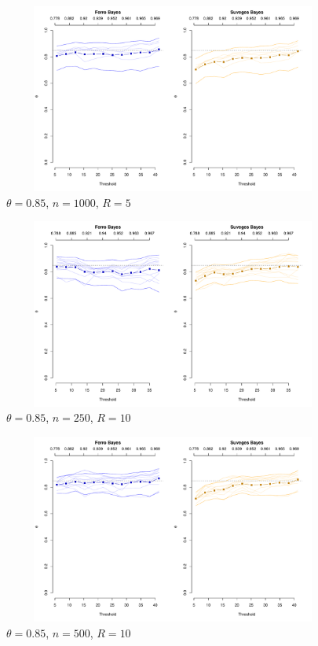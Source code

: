 \documentclass[12pt]{article}
\begin{document}
\begin{figure}
\begin{center}
\includegraphics[width=5.5in, height=2.45in]{../extremal_comparison/figs/sim_frechet_hier_85_1000_5.pdf}
\caption{$\theta=0.85$, $n=1000$, $R=5$}
\end{center}
\end{figure}

\newpage

\begin{figure}
\begin{center}
\includegraphics[width=5.5in, height=2.45in]{../extremal_comparison/figs/sim_frechet_hier_85_250_10.pdf}
\caption{$\theta=0.85$, $n=250$, $R=10$}
\end{center}
\end{figure}

\begin{figure}
\begin{center}
\includegraphics[width=5.5in, height=2.45in]{../extremal_comparison/figs/sim_frechet_hier_85_500_10.pdf}
\caption{$\theta=0.85$, $n=500$, $R=10$}
\end{center}
\end{figure}
\end{document}
